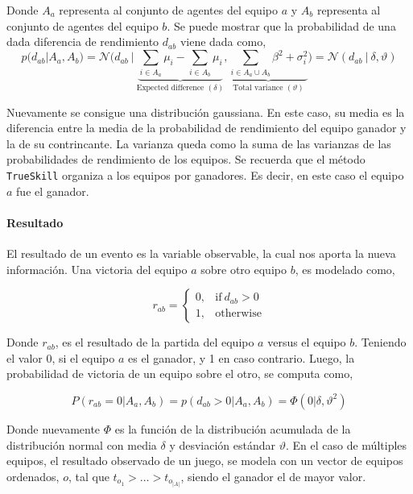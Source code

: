 \documentclass[11pt,twoside,spanish]{report} %
\begin{document}
Donde $A_a$ representa al conjunto de agentes del equipo $a$ y $A_b$ representa al conjunto de agentes del equipo $b$.
Se puede mostrar que la probabilidad de una dada diferencia de rendimiento $d_ {ab}$ viene dada como,
\begin{equation}\label{eq:proba_handicap}
p(d_{ab}|A_a,A_b) = \mathcal{N}\Bigg(d_{ab} \ | \  \underbrace{\sum_{i\in A_a} \mu_i - \sum_{i\in A_b} \mu_i}_{\text{Expected difference }(\delta)},\underbrace{\sum_{i\in A_a\cup A_b} \beta^2 + \sigma_i^2}_{\text{Total variance }(\vartheta)}\Bigg) = \mathcal{N}(d_{ab} \ | \  \delta, \vartheta )
\end{equation}

Nuevamente se consigue una distribuci\'on gaussiana.
En este caso, su media es la diferencia entre la media de la probabilidad de rendimiento del equipo ganador y la de su contrincante. 
La varianza queda como la suma de las varianzas de las probabilidades de rendimiento de los equipos.
Se recuerda que el m\'etodo \texttt{TrueSkill} organiza a los equipos por ganadores.
Es decir, en este caso el equipo $a$ fue el ganador.


\paragraph{Resultado}

El resultado de un evento es la variable observable, la cual nos aporta la nueva informaci\'on.
Una victoria del equipo $ a $ sobre otro equipo $ b $, es modelado como,

\begin{equation}
	r_{ab} =
	\begin{cases}
		0, & \text{if}\ d_{ab} > 0 \\
		1, & \text{otherwise}
	\end{cases}
\end{equation}

Donde $r_{ab}$, es el resultado de la partida del equipo $a$ versus el equipo $b$.
Teniendo el valor 0, si el equipo $a$ es el ganador, y 1 en caso contrario.
Luego, la probabilidad de victoria de un equipo sobre el otro, se computa como,


\begin{equation} \label{eq:proba_win}
P(r_{ab}=0|A_a,A_b) = p(d_{ab} > 0 | A_a,A_b) =  \Phi\left( 0| \delta, \vartheta^2 \right)
\end{equation}

Donde nuevamente $\Phi$ es la funci\'on de la distribuci\'on acumulada de la distribuci\'on normal con media $\delta$ y desviaci\'on est\'andar $\vartheta$.
En el caso de m\'ultiples equipos, el resultado observado de un juego, se modela con un vector de equipos ordenados, $o$, tal que $t_{o_1}> \dots > t_{o_{|A|}}$, siendo el ganador el de mayor valor.
\end{document}
